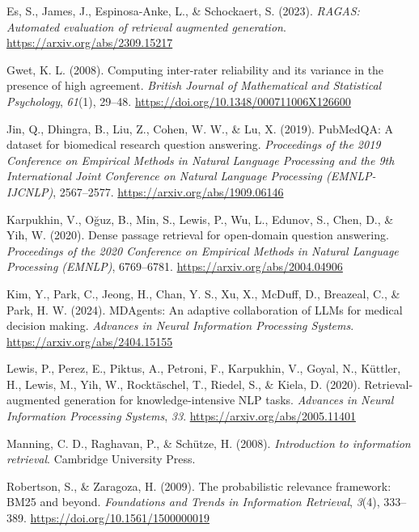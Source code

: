 \documentclass[
  american,
  a4paper,
]{article}
\newlength{\cslhangindent}
\newenvironment{CSLReferences}[2] %
 {\begin{list}{}{%
  \setlength{\itemindent}{0pt}
  \setlength{\leftmargin}{0pt}
  \setlength{\parsep}{0pt}
  \ifodd #1
   \setlength{\leftmargin}{\cslhangindent}
   \setlength{\itemindent}{-1\cslhangindent}
  \fi
  \setlength{\itemsep}{#2\baselineskip}}}
 {\end{list}}
\begin{document}
\protect{}\label{refs}
\begin{CSLReferences}{1}{0}
Es, S., James, J., Espinosa-Anke, L., \& Schockaert, S. (2023).
\emph{{RAGAS}: Automated evaluation of retrieval augmented generation}.
\url{https://arxiv.org/abs/2309.15217}

Gwet, K. L. (2008). Computing inter-rater reliability and its variance
in the presence of high agreement. \emph{British Journal of Mathematical
and Statistical Psychology}, \emph{61}(1), 29--48.
\url{https://doi.org/10.1348/000711006X126600}

Jin, Q., Dhingra, B., Liu, Z., Cohen, W. W., \& Lu, X. (2019).
{PubMedQA}: A dataset for biomedical research question answering.
\emph{Proceedings of the 2019 Conference on Empirical Methods in Natural
Language Processing and the 9th International Joint Conference on
Natural Language Processing (EMNLP-IJCNLP)}, 2567--2577.
\url{https://arxiv.org/abs/1909.06146}

Karpukhin, V., Oğuz, B., Min, S., Lewis, P., Wu, L., Edunov, S., Chen,
D., \& Yih, W. (2020). Dense passage retrieval for open-domain question
answering. \emph{Proceedings of the 2020 Conference on Empirical Methods
in Natural Language Processing (EMNLP)}, 6769--6781.
\url{https://arxiv.org/abs/2004.04906}

Kim, Y., Park, C., Jeong, H., Chan, Y. S., Xu, X., McDuff, D., Breazeal,
C., \& Park, H. W. (2024). {MDAgents}: An adaptive collaboration of
{LLM}s for medical decision making. \emph{Advances in Neural Information
Processing Systems}. \url{https://arxiv.org/abs/2404.15155}

Lewis, P., Perez, E., Piktus, A., Petroni, F., Karpukhin, V., Goyal, N.,
Küttler, H., Lewis, M., Yih, W., Rocktäschel, T., Riedel, S., \& Kiela,
D. (2020). Retrieval-augmented generation for knowledge-intensive {NLP}
tasks. \emph{Advances in Neural Information Processing Systems},
\emph{33}. \url{https://arxiv.org/abs/2005.11401}

Manning, C. D., Raghavan, P., \& Schütze, H. (2008). \emph{Introduction
to information retrieval}. Cambridge University Press.

Robertson, S., \& Zaragoza, H. (2009). The probabilistic relevance
framework: {BM25} and beyond. \emph{Foundations and Trends in
Information Retrieval}, \emph{3}(4), 333--389.
\url{https://doi.org/10.1561/1500000019}


\end{CSLReferences}
\end{document}
